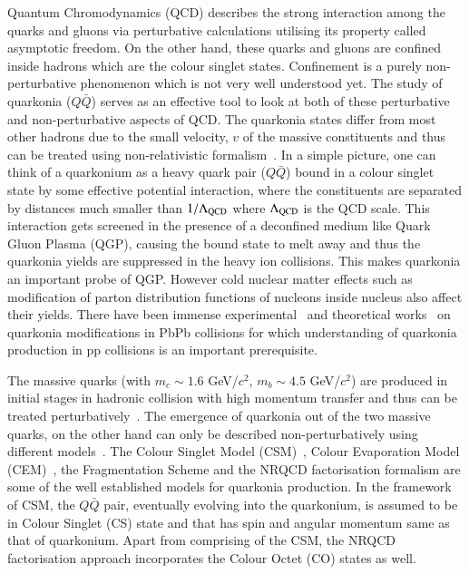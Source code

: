Quantum Chromodynamics (QCD) describes the strong interaction among the
quarks and gluons via perturbative calculations utilising its property called asymptotic freedom.
On the other hand, these quarks and gluons are confined inside hadrons which are the colour singlet states.
Confinement is a purely non-perturbative phenomenon which is not very well understood yet. 
The study of quarkonia ($Q\bar{Q}$) serves as an effective 
tool to look at  both of these perturbative and non-perturbative aspects of QCD.
The quarkonia states differ from most other hadrons due to the small velocity, $v$ of the massive
constituents and thus can be treated using non-relativistic formalism~\cite{Povh:1995mua,Ikhdair:2005jf}. 
In a simple picture, one can think of a quarkonium as a heavy quark pair ($Q\bar{Q}$) bound
in a colour singlet state by some effective potential interaction, where the constituents are 
separated by distances much smaller than $1/\Lambda_{\rm QCD}$ where $\Lambda_{\rm QCD}$
is the QCD scale. This interaction gets screened 
in the presence of a deconfined medium like Quark Gluon Plasma (QGP), causing 
the bound state to melt away and thus the quarkonia yields are suppressed in the 
heavy ion collisions. This makes quarkonia an important probe of QGP. However cold nuclear matter 
effects such as modification of parton distribution functions of nucleons inside nucleus also 
affect their yields.
There have been immense experimental~\cite{Sirunyan:2017isk,Sirunyan:2018nsz,Acharya:2019iur,Acharya:2018mni}
and theoretical works~\cite{Strickland:2011mw,Song:2011nu,Kumar:2014kfa,Kumar:2019xdj} on
quarkonia modifications in PbPb collisions for which understanding of quarkonia
production in pp collisions is an important prerequisite.

The massive quarks (with $m_c\sim 1.6$ GeV/$c^2$, $m_b\sim 4.5$ GeV/$c^2$) are produced
in initial stages in hadronic collision with high momentum transfer and thus
can be treated perturbatively~\cite{Nason:1989zy}. The emergence of quarkonia
out of the two massive quarks, on the other hand can only be described non-perturbatively using different
models~\cite{Bodwin:1994jh,Brambilla:2014jmp}.
The Colour Singlet Model (CSM)~\cite{Einhorn:1975ua,Berger:1980ni},
Colour Evaporation Model (CEM)~\cite{Fritzsch:1977ay,Amundson:1995em}, the Fragmentation Scheme and 
the NRQCD factorisation formalism are some of the well established models for quarkonia production.
In the framework of CSM, the $Q\bar{Q}$ pair, eventually evolving into the quarkonium,
is assumed to be in Colour Singlet (CS) state and that has spin and 
angular momentum same as that of quarkonium.
Apart from comprising of the CSM, the NRQCD factorisation approach incorporates 
the Colour Octet (CO) states as well.

